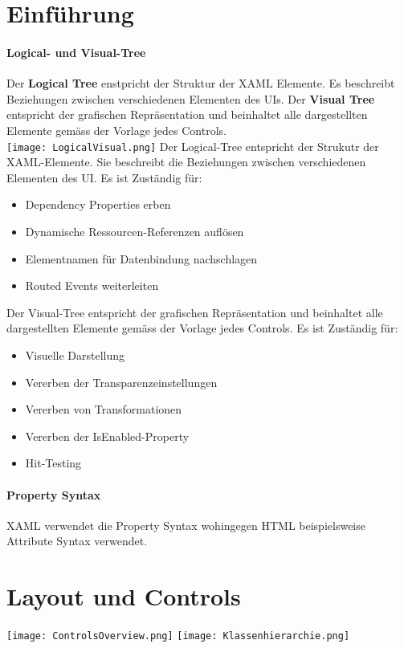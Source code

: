\section{Einführung}
\paragraph{Logical- und Visual-Tree}
Der \textbf{Logical Tree} enstpricht der Struktur der XAML Elemente. Es beschreibt Beziehungen zwischen verschiedenen Elementen des UIs. Der \textbf{Visual Tree} entspricht der grafischen Repräsentation und beinhaltet alle dargestellten Elemente gemäss der Vorlage jedes Controls. \\
\texttt{[image: LogicalVisual.png]}
Der Logical-Tree entspricht der Strukutr der XAML-Elemente. Sie beschreibt die Beziehungen zwischen verschiedenen Elementen des UI. Es ist Zuständig für:
\begin{itemize}
    \item Dependency Properties erben
    \item Dynamische Ressourcen-Referenzen auflösen
    \item Elementnamen für Datenbindung nachschlagen
    \item Routed Events weiterleiten
\end{itemize}
Der Visual-Tree entspricht der grafischen Repräsentation und beinhaltet alle dargestellten Elemente gemäss der Vorlage jedes Controls. Es ist Zuständig für:
\begin{itemize}
    \item Visuelle Darstellung
    \item Vererben der Transparenzeinstellungen
    \item Vererben von Transformationen
    \item Vererben der IsEnabled-Property
    \item Hit-Testing
\end{itemize}
\paragraph{Property Syntax} XAML verwendet die Property Syntax wohingegen HTML beispielsweise Attribute Syntax verwendet.
\section{Layout und Controls}
\texttt{[image: ControlsOverview.png]}
\texttt{[image: Klassenhierarchie.png]}
